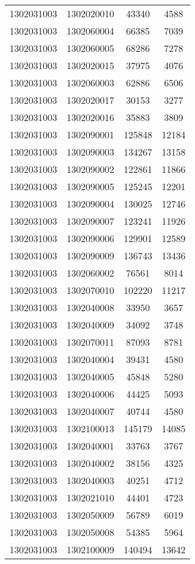 \begin{longtable}{llcc}
1302031003 & 1302020010 & 43340 & 4588\\
1302031003 & 1302060004 & 66385 & 7039\\
1302031003 & 1302060005 & 68286 & 7278\\
1302031003 & 1302020015 & 37975 & 4076\\
1302031003 & 1302060003 & 62886 & 6506\\
1302031003 & 1302020017 & 30153 & 3277\\
1302031003 & 1302020016 & 35883 & 3809\\
1302031003 & 1302090001 & 125848 & 12184\\
1302031003 & 1302090003 & 134267 & 13158\\
1302031003 & 1302090002 & 122861 & 11866\\
1302031003 & 1302090005 & 125245 & 12201\\
1302031003 & 1302090004 & 130025 & 12746\\
1302031003 & 1302090007 & 123241 & 11926\\
1302031003 & 1302090006 & 129901 & 12589\\
1302031003 & 1302090009 & 136743 & 13436\\
1302031003 & 1302060002 & 76561 & 8014\\
1302031003 & 1302070010 & 102220 & 11217\\
1302031003 & 1302040008 & 33950 & 3657\\
1302031003 & 1302040009 & 34092 & 3748\\
1302031003 & 1302070011 & 87093 & 8781\\
1302031003 & 1302040004 & 39431 & 4580\\
1302031003 & 1302040005 & 45848 & 5280\\
1302031003 & 1302040006 & 44425 & 5093\\
1302031003 & 1302040007 & 40744 & 4580\\
1302031003 & 1302100013 & 145179 & 14085\\
1302031003 & 1302040001 & 33763 & 3767\\
1302031003 & 1302040002 & 38156 & 4325\\
1302031003 & 1302040003 & 40251 & 4712\\
1302031003 & 1302021010 & 44401 & 4723\\
1302031003 & 1302050009 & 56789 & 6019\\
1302031003 & 1302050008 & 54385 & 5964\\
1302031003 & 1302100009 & 140494 & 13642\\

\end{longtable}
